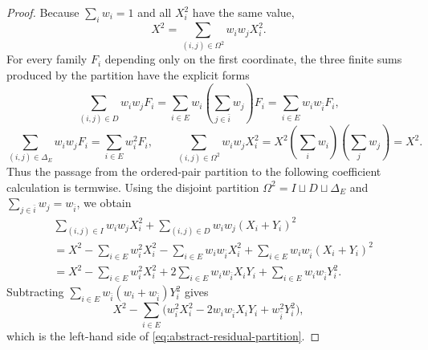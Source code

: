 \documentclass[11pt]{article}
\begin{document}
\begin{proof}
Because $\sum_iw_i=1$ and all $X_i^2$ have the same value,
\[
X^2=\sum_{(i,j)\in\Omega^2}w_iw_jX_i^2.
\]
For every family $F_i$ depending only on the first coordinate, the three
finite sums produced by the partition have the explicit forms
\[
\sum_{(i,j)\in D}w_iw_jF_i
=\sum_{i\in E}w_i\left(\sum_{j\in\bar i}w_j\right)F_i
=\sum_{i\in E}w_iw_{\bar i}F_i,
\]
\[
\sum_{(i,j)\in\Delta_E}w_iw_jF_i
=\sum_{i\in E}w_i^2F_i,
\qquad
\sum_{(i,j)\in\Omega^2}w_iw_jX_i^2
=X^2\left(\sum_iw_i\right)\left(\sum_jw_j\right)=X^2.
\]
Thus the passage from the ordered-pair partition to the following
coefficient calculation is termwise.
Using the disjoint partition $\Omega^2=I\sqcup D\sqcup\Delta_E$ and
$\sum_{j\in\bar i}w_j=w_{\bar i}$, we obtain
\begin{align*}
&\sum_{(i,j)\in I}w_iw_jX_i^2
 +\sum_{(i,j)\in D}w_iw_j(X_i+Y_i)^2\\
&=X^2-\sum_{i\in E}w_i^2X_i^2
       -\sum_{i\in E}w_iw_{\bar i}X_i^2
  +\sum_{i\in E}w_iw_{\bar i}(X_i+Y_i)^2\\
&=X^2-\sum_{i\in E}w_i^2X_i^2
  +2\sum_{i\in E}w_iw_{\bar i}X_iY_i
  +\sum_{i\in E}w_iw_{\bar i}Y_i^2.
\end{align*}
Subtracting
$\sum_{i\in E}w_{\bar i}(w_i+w_{\bar i})Y_i^2$ gives
\[
X^2-\sum_{i\in E}
\bigl(w_i^2X_i^2-2w_iw_{\bar i}X_iY_i+w_{\bar i}^2Y_i^2\bigr),
\]
which is the left-hand side of
\eqref{eq:abstract-residual-partition}.
\end{proof}
\end{document}
